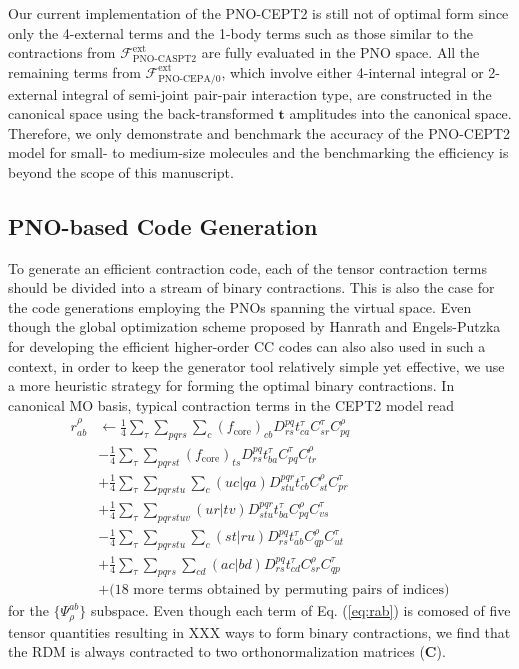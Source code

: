 \documentclass[aip,jcp,amsmath]{revtex4-1}
\begin{document}
%
Our current implementation of the PNO-CEPT2 is still not of optimal form since only the 4-external terms and the 1-body terms such as those similar to the contractions from $\mathscr{F}_\text{PNO-CASPT2}^\text{ext}$ are fully evaluated in the PNO space.
%
All the remaining terms from $\mathscr{F}_\text{PNO-CEPA/0}^\text{ext}$, which involve either 4-internal integral or 2-external integral of semi-joint pair-pair interaction type,\cite{neeseefficient2009cepa,neeseefficient2009} are constructed in the canonical space using the back-transformed $\mathbf{t}$ amplitudes into the canonical space.
%
Therefore, we only demonstrate and benchmark the accuracy of the PNO-CEPT2 model for small- to medium-size molecules and the benchmarking the efficiency is beyond the scope of this manuscript.

\subsection{PNO-based Code Generation}
%
To generate an efficient contraction code, each of the tensor contraction terms should be divided into a stream of binary contractions.
%
This is also the case for the code generations employing the PNOs spanning the virtual space.
%
Even though the global optimization scheme proposed by Hanrath and Engels-Putzka for developing the efficient higher-order CC codes\cite{hanrathan2010,engels-putzkaa2011} can also also used in such a context, in order to keep the generator tool relatively simple yet effective, we use a more heuristic strategy for forming the optimal binary contractions.
%
In canonical MO basis, typical contraction terms in the CEPT2 model read
%
\begin{align}
  r_{ab}^\rho &\leftarrow \frac{1}{4}\sum_\tau\sum_{pqrs}\sum_{c}(f_\text{core})_{cb} D^{pq}_{rs} t_{ca}^\tau C_{sr}^\tau C_{pq}^\rho \nonumber \\
  &-\frac{1}{4}\sum_\tau\sum_{pqrst} (f_\text{core})_{ts} D^{pq}_{rs} t_{ba}^\tau C_{pq}^\tau C_{tr}^\rho \nonumber \\
  &+\frac{1}{4}\sum_\tau\sum_{pqrstu}\sum_c (uc|qa) D^{pqr}_{stu} t_{cb}^\tau C_{st}^\rho C_{pr}^\tau \nonumber \\
  &+\frac{1}{4}\sum_\tau\sum_{pqrstuv} (ur|tv) D^{pqr}_{stu} t_{ba}^\tau C_{pq}^\rho C_{vs}^\tau  \nonumber \\
  &-\frac{1}{4}\sum_\tau\sum_{pqrstu}\sum_c (st|ru) D^{pq}_{rs} t_{ab}^\tau C_{qp}^\rho C_{ut}^\tau \nonumber \\
  &+\frac{1}{4}\sum_\tau\sum_{pqrs}\sum_{cd} (ac|bd) D^{pq}_{rs} t_{cd}^\tau C_{sr}^\rho C_{qp}^\tau \nonumber \\
  &+\text{(18 more terms obtained by permuting pairs of indices)} \label{eq:rab}
\end{align}
%
for the $\{\Psi_{\rho}^{ab}\}$ subspace.
%
Even though each term of Eq. (\ref{eq:rab}) is comosed of five tensor quantities resulting in XXX ways to form binary contractions, we find that the RDM is always contracted to two orthonormalization matrices ($\mathbf{C}$).
%
\end{document}
